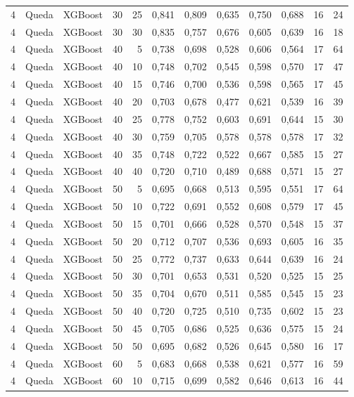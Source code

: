 \begin{longtable}{@{}rllrrrrrrrrr@{}}
4 & Queda & XGBoost & 30 & 25 & 0,841 & 0,809 & 0,635 & 0,750 & 0,688 & 16 & 24 \\
4 & Queda & XGBoost & 30 & 30 & 0,835 & 0,757 & 0,676 & 0,605 & 0,639 & 16 & 18 \\
4 & Queda & XGBoost & 40 & 5 & 0,738 & 0,698 & 0,528 & 0,606 & 0,564 & 17 & 64 \\
4 & Queda & XGBoost & 40 & 10 & 0,748 & 0,702 & 0,545 & 0,598 & 0,570 & 17 & 47 \\
4 & Queda & XGBoost & 40 & 15 & 0,746 & 0,700 & 0,536 & 0,598 & 0,565 & 17 & 45 \\
4 & Queda & XGBoost & 40 & 20 & 0,703 & 0,678 & 0,477 & 0,621 & 0,539 & 16 & 39 \\
4 & Queda & XGBoost & 40 & 25 & 0,778 & 0,752 & 0,603 & 0,691 & 0,644 & 15 & 30 \\
4 & Queda & XGBoost & 40 & 30 & 0,759 & 0,705 & 0,578 & 0,578 & 0,578 & 17 & 32 \\
4 & Queda & XGBoost & 40 & 35 & 0,748 & 0,722 & 0,522 & 0,667 & 0,585 & 15 & 27 \\
4 & Queda & XGBoost & 40 & 40 & 0,720 & 0,710 & 0,489 & 0,688 & 0,571 & 15 & 27 \\
4 & Queda & XGBoost & 50 & 5 & 0,695 & 0,668 & 0,513 & 0,595 & 0,551 & 17 & 64 \\
4 & Queda & XGBoost & 50 & 10 & 0,722 & 0,691 & 0,552 & 0,608 & 0,579 & 17 & 45 \\
4 & Queda & XGBoost & 50 & 15 & 0,701 & 0,666 & 0,528 & 0,570 & 0,548 & 15 & 37 \\
4 & Queda & XGBoost & 50 & 20 & 0,712 & 0,707 & 0,536 & 0,693 & 0,605 & 16 & 35 \\
4 & Queda & XGBoost & 50 & 25 & 0,772 & 0,737 & 0,633 & 0,644 & 0,639 & 16 & 24 \\
4 & Queda & XGBoost & 50 & 30 & 0,701 & 0,653 & 0,531 & 0,520 & 0,525 & 15 & 25 \\
4 & Queda & XGBoost & 50 & 35 & 0,704 & 0,670 & 0,511 & 0,585 & 0,545 & 15 & 23 \\
4 & Queda & XGBoost & 50 & 40 & 0,720 & 0,725 & 0,510 & 0,735 & 0,602 & 15 & 23 \\
4 & Queda & XGBoost & 50 & 45 & 0,705 & 0,686 & 0,525 & 0,636 & 0,575 & 15 & 24 \\
4 & Queda & XGBoost & 50 & 50 & 0,695 & 0,682 & 0,526 & 0,645 & 0,580 & 16 & 17 \\
4 & Queda & XGBoost & 60 & 5 & 0,683 & 0,668 & 0,538 & 0,621 & 0,577 & 16 & 59 \\
4 & Queda & XGBoost & 60 & 10 & 0,715 & 0,699 & 0,582 & 0,646 & 0,613 & 16 & 44 \\

\end{longtable}
